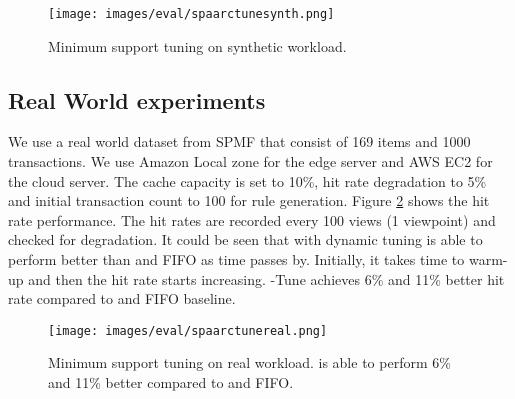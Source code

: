         \begin{figure}[t]
            \centering
            \texttt{[image: images/eval/spaarctunesynth.png]}
            \caption{Minimum support tuning on synthetic workload. %
            }
            \label{fig:tuningsynth}
        \end{figure}
    
    \subsection{Real World experiments}
        We use a real world dataset from SPMF \cite{bib:spmf} that consist of 169 items and 1000 transactions. We use Amazon Local zone for the edge server and AWS EC2 for the cloud server. The cache capacity is set to 10\%, hit rate degradation to 5\% and initial transaction count to 100 for rule generation. Figure \ref{fig:tuningreal} shows the hit rate performance. The hit rates are recorded every 100 views (1 viewpoint) and checked for degradation. It could be seen that \spaarc{} with dynamic tuning is able to perform better than \spaarc{} and FIFO as time passes by. Initially, it takes time to warm-up and then the hit rate starts increasing. %
        \spaarc{}-Tune achieves 6\% and 11\% better hit rate compared to \spaarc{} and FIFO baseline.
        \begin{figure}[h]
            \centering
            \texttt{[image: images/eval/spaarctunereal.png]}
            \caption{Minimum support tuning on real workload. \spaarc{} is able to perform 6\% and 11\% better compared to \spaarc{} and FIFO.}
            \label{fig:tuningreal}
        \end{figure}